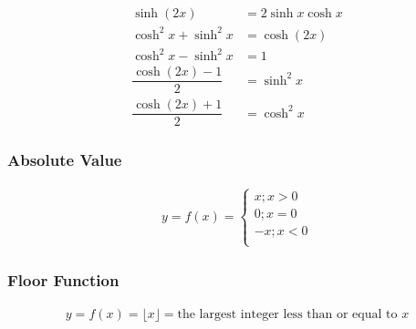 \documentclass[fleqn]{article}
\begin{document}
\begin{align}
	\sinh (2x) &= 2 \sinh x \cosh x \\
	\cosh ^2 x + \sinh ^2 x &= \cosh (2x) \\
	\cosh ^2 x - \sinh ^2 x &= 1 \\
	\dfrac{\cosh (2x) - 1}{2} &= \sinh ^2 x \\
	\dfrac{\cosh (2x) + 1}{2} &= \cosh ^2 x 
\end{align}

\subsubsection{Absolute Value}

\begin{align}
	y = f(x) = 
	\begin{cases}
		x ; x > 0 \\
		0 ; x = 0 \\
		-x ; x < 0 \\
	\end{cases}
\end{align}

\subsubsection{Floor Function}

\begin{align}
	y = f(x) = \lfloor x \rfloor = \text{the largest integer less than or equal to }x
\end{align}
\end{document}
